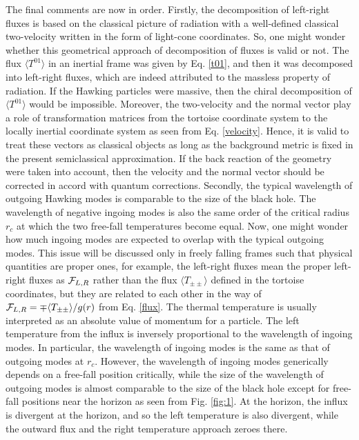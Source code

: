\documentclass[aps,a4paper,showpacs,showkeys,superscriptaddress,12pt]{revtex4-1}
\begin{document}
The final comments are now in order.
Firstly, the decomposition of left-right fluxes is based on the classical picture of radiation
with a well-defined classical two-velocity written in the form of light-cone coordinates.
So, one might wonder whether this geometrical approach of decomposition of fluxes
is valid or not. The flux $\langle T^{01} \rangle$ in an inertial frame was given by Eq. \eqref{t01},
and then it
was decomposed into left-right fluxes, which are indeed attributed to the massless property of radiation.
If the Hawking particles were massive, then the chiral decomposition of $\langle T^{01} \rangle$
would be impossible. Moreover, the two-velocity and the normal vector play a role of
transformation matrices from the tortoise coordinate system to the locally inertial coordinate
system as seen from Eq. \eqref{velocity}.
Hence, it is valid to treat these vectors as classical objects
as long as the background metric is fixed in the present semiclassical approximation.
If the back reaction of the geometry were taken into account, then the velocity and the normal vector
should be corrected in accord with quantum corrections.
Secondly, the typical wavelength of outgoing Hawking modes
is comparable to the size of the black hole.
The wavelength of negative ingoing modes
is also the same order of the critical radius $r_c$ at which the two free-fall temperatures become equal.
Now, one might wonder
how much ingoing modes are expected to overlap with the typical
outgoing modes.
This issue will be discussed only in freely falling frames such that
physical quantities are proper ones, for example, the left-right fluxes mean the proper left-right fluxes
as ${\cal F}_{L,R}$ rather than
the flux $\langle T_{\pm\pm} \rangle$ defined in the tortoise coordinates, but
they are related to each other in the way of ${\cal F}_{L,R}=\mp \langle T_{\pm\pm} \rangle /g(r)$ from Eq. \eqref{flux}.
The thermal temperature is usually interpreted as an absolute value of momentum
for a particle. The left temperature from the influx is inversely proportional to the wavelength of ingoing modes.
In particular, the wavelength of ingoing modes is the same as that of outgoing modes at $r_c$.
However,
the wavelength of ingoing modes generically depends on a free-fall position critically, while
the size of the wavelength of outgoing modes is almost comparable to the size of the black hole except for
free-fall positions near the horizon as seen from Fig. \ref{fig:1}.
At the horizon, the influx is divergent at the horizon, and so the left temperature is also
divergent, while the outward flux and the right temperature approach zeroes there.
\end{document}

